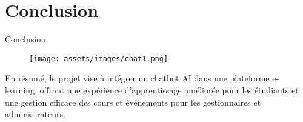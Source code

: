 \section{Conclusion}

\begin{frame}{Conclusion}
    \begin{figure}[H]
        \centering
        \texttt{[image: assets/images/chat1.png]}
    \end{figure}
    En résumé, le projet vise à intégrer un chatbot AI dans une plateforme e-learning, offrant une expérience d’apprentissage améliorée pour les étudiants et une gestion efficace des cours et événements pour les gestionnaires et administrateurs.
\end{frame}

